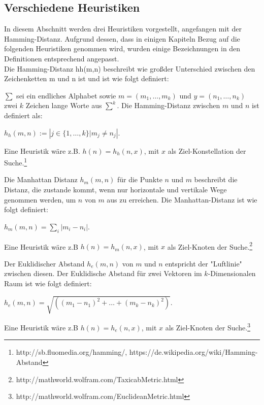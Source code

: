 \subsection{Verschiedene Heuristiken}
In diesem Abschnitt werden drei Heuristiken vorgestellt, angefangen mit der Hamming-Distanz. Aufgrund dessen, dass in einigen Kapiteln Bezug auf die folgenden Heuristiken genommen wird, wurden einige Bezeichnungen in den Definitionen entsprechend angepasst.\\
Die Hamming-Distanz hh(m,n) beschreibt wie gro\ss der Unterschied zwischen den Zeichenketten m und n ist und ist wie folgt definiert: 
\begin{defi}
$\sum$ sei ein endliches Alphabet sowie $m = (m_{1}, \dots, m_{k})$ und $y = (n_{1}, \dots, n_{k})$ zwei $k$ Zeichen lange Worte aus $\sum^{k}$. Die Hamming-Distanz zwischen $m$ und $n$ ist definiert als:
\begin{center}
$h_{h}(m,n) := |{j \in \{1 , \dots , k\} | m_{j} \neq n_{j}}|$.
\end{center}
\end{defi}
Eine Heuristik w\"are z.B. $h(n)=h_{h}(n,x)$, mit $x$ als Ziel-Konstellation der Suche.\footnote{http://sb.fluomedia.org/hamming/, https://de.wikipedia.org/wiki/Hamming-Abstand}
\begin{defi}
Die Manhattan Distanz $h_{m}(m,n)$ f\"ur die Punkte $n$ und $m$ beschreibt die Distanz, die zustande kommt, wenn nur horizontale und vertikale Wege genommen werden, um $n$ von $m$ aus zu erreichen. Die Manhattan-Distanz ist wie folgt definiert:
\begin{center}
$h_{m}(m,n) = \sum_{i} |m_{i} - n_{i}|.$
\end{center}
\end{defi}
Eine Heuristik w\"are z.B $h(n)=h_{m}(n,x)$, mit $x$ als Ziel-Knoten der Suche.\footnote{http://mathworld.wolfram.com/TaxicabMetric.html}
\begin{defi}
Der Euklidischer Abstand $h_{e}(m,n)$ von $m$ und $n$ entspricht der "Luftlinie" zwischen diesen. Der Euklidische Abstand f\"ur zwei Vektoren im $k$-Dimensionalen Raum ist wie folgt definiert:
\begin{center}
$h_{e}(m,n) =\sqrt{((m_{1} - n_{1})^{2}+\dots+(m_{k} - n_{k})^{2})}.$
\end{center}
\end{defi}
Eine Heuristik w\"are z.B $h(n)= h_{e}(n,x)$, mit $x$ als Ziel-Knoten der Suche.\footnote{http://mathworld.wolfram.com/EuclideanMetric.html}

